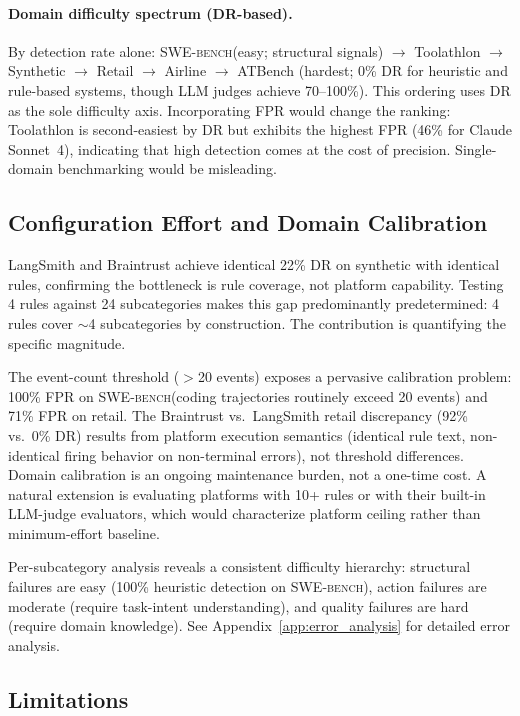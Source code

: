 \documentclass[11pt]{article}
\newcommand{\swebench}{\textsc{SWE-bench}\xspace}
\begin{document}
\paragraph{Domain difficulty spectrum (DR-based).}
By detection rate alone: \swebench (easy; structural signals) $\to$
Toolathlon $\to$ Synthetic $\to$ Retail $\to$ Airline $\to$ ATBench
(hardest; 0\% DR for heuristic and rule-based systems, though LLM
judges achieve 70--100\%). This ordering uses DR as the sole difficulty
axis. Incorporating FPR would change the ranking: Toolathlon is
second-easiest by DR but exhibits the highest FPR (46\% for Claude
Sonnet~4), indicating that high detection comes at the cost of
precision. Single-domain benchmarking would be misleading.

\subsection{Configuration Effort and Domain Calibration}
\label{sec:analysis:config}

LangSmith and Braintrust achieve identical 22\% DR on synthetic with
identical rules, confirming the bottleneck is rule coverage, not
platform capability. Testing 4 rules against 24 subcategories makes this
gap predominantly predetermined: 4 rules cover $\sim$4 subcategories by
construction. The contribution is quantifying the specific magnitude.

The event-count threshold ($>$20 events) exposes a pervasive calibration
problem: 100\% FPR on \swebench (coding trajectories routinely exceed 20
events) and 71\% FPR on retail. The Braintrust vs.\ LangSmith retail
discrepancy (92\% vs.\ 0\% DR) results from platform execution semantics
(identical rule text, non-identical firing behavior on non-terminal
errors), not threshold differences. Domain calibration is an ongoing
maintenance burden, not a one-time cost. A natural extension is evaluating
platforms with 10+ rules or with their built-in LLM-judge evaluators,
which would characterize platform ceiling rather than minimum-effort
baseline.

Per-subcategory analysis reveals a consistent difficulty hierarchy:
structural failures are easy (100\% heuristic detection on \swebench),
action failures are moderate (require task-intent understanding),
and quality failures are hard (require domain knowledge). See
Appendix~\ref{app:error_analysis} for detailed error analysis.

\subsection{Limitations}
\label{sec:limitations}
\end{document}
